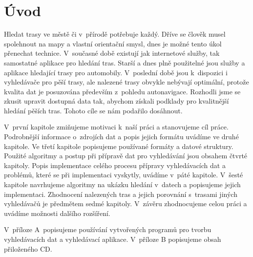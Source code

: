 \chapter{Úvod}

Hledat trasy ve městě či v~přírodě potřebuje každý. Dříve se člověk musel
spolehnout na mapy a vlastní orientační smysl, dnes je možné tento úkol
přenechat technice. V~současné době existují jak internetové služby, tak
samostatné aplikace pro hledání tras. Starší a dnes plně použitelné jsou služby a
aplikace hledající trasy pro automobily. V~poslední době jsou k~dispozici i
vyhledávače pro pěší trasy, ale nalezené trasy obvykle nebývají optimální,
protože kvalita dat je posuzována především z~pohledu autonavigace. Rozhodli
jsme se zkusit upravit dostupná data tak, abychom získali podklady pro
kvalitnější hledání pěších tras. Tohoto cíle se nám podařilo dosáhnout. 

V~první kapitole zmiňujeme motivaci k~naší práci a stanovujeme cíl práce.
Podrobnější informace o~zdrojích dat a popis jejich formátu uvádíme ve druhé
kapitole. Ve třetí kapitole popisujeme používané formáty a datové struktury.
Použité algoritmy a postup při přípravě dat pro vyhledávání jsou obsahem čtvrté
kapitoly. Popis implementace celého procesu přípravy vyhledávacích dat a
problémů, které se při implementaci vyskytly, uvádíme v~páté kapitole. V~šesté
kapitole navrhujeme algoritmy na ukázku hledání v~datech a popisujeme jejich
implementaci. Zhodnocení nalezených tras a jejich porovnání s~trasami jiných
vyhledávačů je předmětem sedmé kapitoly. V~závěru zhodnocujeme celou práci a
uvádíme možnosti dalšího rozšíření.

V~příloze A~popisujeme používání vytvořených programů pro tvorbu vyhledávacích
dat a vyhledávací aplikace. V~příloze B popisujeme obsah přiloženého CD.



